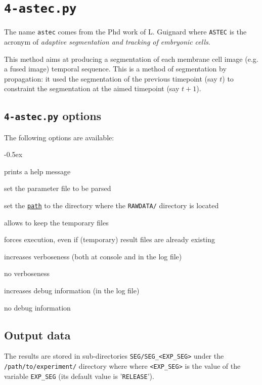 \section{\texttt{4-astec.py}}
\label{sec:cli:astec}

The name \texttt{astec} comes from the Phd work of L. Guignard \cite{guignard:tel-01278725} where \texttt{ASTEC} is the acronym of \textit{adaptive segmentation and tracking of embryonic cells}.

This method aims at producing a segmentation of each membrane cell image  (e.g. a fused image) temporal sequence. This is a method of segmentation by propagation: it used the segmentation of the previous timepoint (say $t$) to constraint the segmentation at the aimed timepoint (say $t+1$).


\subsection{\texttt{4-astec.py} options}

The following options are available:
\begin{description}
  \itemsep -0.5ex
\item[\texttt{-h}] prints a help message
\item[\texttt{-p \underline{file}}] set the parameter file to be parsed
\item[\texttt{-e \underline{path}}] set the
  \texttt{\underline{path}} to the directory where the
  \texttt{RAWDATA/} directory is located
\item[\texttt{-k}] allows to keep the temporary files
\item[\texttt{-f}] forces execution, even if (temporary) result files
  are already existing
\item[\texttt{-v}] increases verboseness (both at console and in the
  log file)
\item[\texttt{-nv}] no verboseness
\item[\texttt{-d}]  increases debug information (in the
  log file)
\item[\texttt{-nd}] no debug information
\end{description}



\subsection{Output data}

The results are stored in sub-directories
\texttt{SEG/SEG\_<EXP\_SEG>} under the
\texttt{/path/to/experiment/} directory where where \texttt{<EXP\_SEG>} is the value of the variable \texttt{EXP\_SEG} (its
default value is '\texttt{RELEASE}'). 

